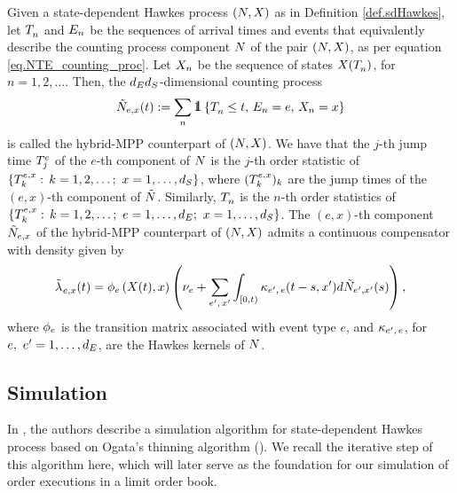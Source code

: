 \documentclass[10pt, article,table]{article}
\begin{document}
Given a state-dependent Hawkes process $(\multiCountingProc, \stateVariable)$ as in Definition \ref{def.sdHawkes}, let $\arrivalTimes[]_n$ and $\event[n]$ be the sequences of arrival times and events that equivalently describe the counting process component $\multiCountingProc$ of the pair $(\multiCountingProc, \stateVariable)$, as per equation \eqref{eq.NTE_counting_proc}. Let $\stateVariable_n$ be the sequence of states $X(\arrivalTimes[]_n)$, for $n=1,2,\dots$. Then, the 
$\numEventTypes\numStates$-dimensional counting process
\begin{equation}\label{eq.hybridHawkes}
 \hybridHawkes_{e,x}(t) := 
 \sum_{n} \one \left\lbrace \arrivalTimes[]_n \leq t, \, \event[n] = e, \, 
 \stateVariable_n = x \right\rbrace
\end{equation}
is called the hybrid-MPP counterpart of  $(\multiCountingProc, \stateVariable)$.
We have that the $j$-th jump time $\arrivalTimes[e]_j$ of the $e$-th component of $\multiCountingProc$ is the $j$-th order statistic of $\lbrace \arrivalTimes[e,x]_k: \, k=1,2,\dots; \, \, x=1,\dots,\numStates \rbrace$, where $(\arrivalTimes[e,x]_k)_k$ are the jump times of the $(e,x)$-th component of $\hybridHawkes$. Similarly, $\arrivalTimes[]_n$ is the $n$-th order statistics of $\lbrace \arrivalTimes[e,x]_k: \, k=1,2,\dots; \, \, e=1,\dots, \numEventTypes; \, \,  x=1,\dots,\numStates \rbrace$. The $(e,x)$-th component $ \hybridHawkes_{e,x}$ of the hybrid-MPP counterpart of $(\multiCountingProc, \stateVariable)$ admits a continuous compensator with density given by 
\begin{equation}\label{eq.intensity_of_hybridMPP}
 \hybridIntensity_{e,x}(t) 
 =
 \transProb_{e}\left(\stateVariable(t),x\right)
 \left(
 \baseRate_e
 +\sum_{\eone,\, \xone} \int_{[0,t)} \hawkesKernel\subscriptee(t-s,\xone)d\hybridHawkes_{\eone,\xone}(s)
 \right),
\end{equation}
where $\transProb_{e}$ is the transition matrix associated with event type $e$, and $\hawkesKernel\subscriptee$, for $e,\, \, \eone = 1,\dots,\numEventTypes$, are the Hawkes kernels of $\multiCountingProc$.


\subsection{Simulation}\label{sec.simulation}
In \citealp{MP18sta}, the authors describe a simulation algorithm for state-dependent Hawkes process based on Ogata's thinning algorithm (\citealp{Oga81lew}). We recall the iterative step of this algorithm here, which will later serve as the foundation for our simulation of order executions in a limit order book.
\end{document}
